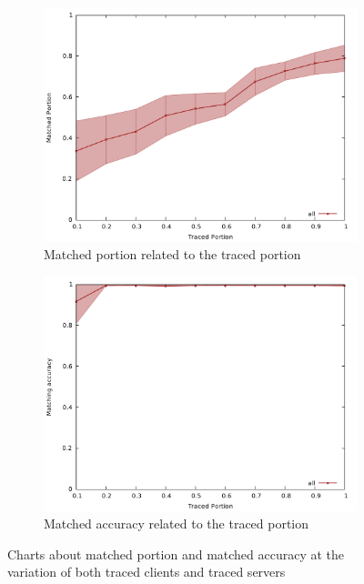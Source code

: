 \begin{figure}
	\begin{subfigure}{.5\textwidth}
		\centering
		\includegraphics[width=1\linewidth]{graphs/cs_tport_mport.pdf}
		\caption{Matched portion related to the traced portion}
		\label{fig:g_tporta}
	\end{subfigure} 
	\begin{subfigure}{.5\textwidth}
		\centering
		\includegraphics[width=1\linewidth]{graphs/cs_tport_pmatch.pdf}
		\caption{Matched accuracy related to the traced portion}
		\label{fig:g_tportb}
	\end{subfigure} 
	\caption{Charts about matched portion and matched accuracy at the variation of both
traced clients and traced servers}
	\label{fig:g_tport}
\end{figure}


